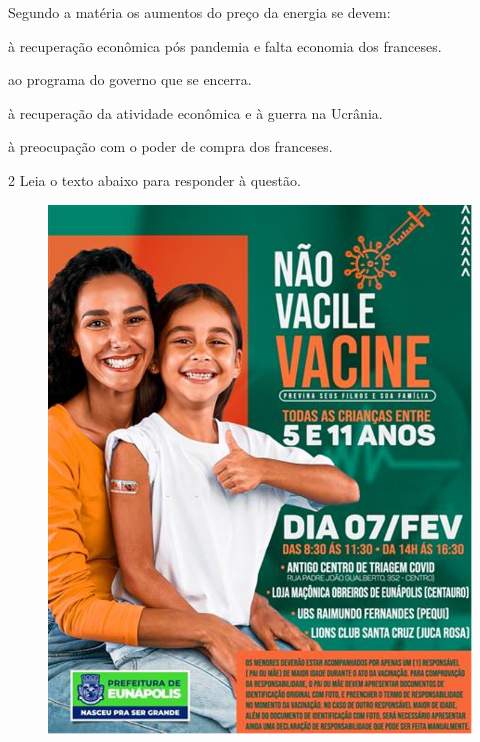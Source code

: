 
Segundo a matéria os aumentos do preço da energia se devem:

\begin{escolha}
    
    \item à recuperação econômica pós pandemia e falta economia dos franceses.
    
    \item ao programa do governo que se encerra.
    
    \item à recuperação da atividade econômica e à guerra na Ucrânia.
    
    \item à preocupação com o poder de compra dos franceses.

\end{escolha}

\pagebreak

\num{2} Leia o texto abaixo para responder à questão. 


\begin{figure}[H]
\centering\includegraphics[width=.5\textwidth]{imgSAEB_7_POR/media/image24.png}
\end{figure}



